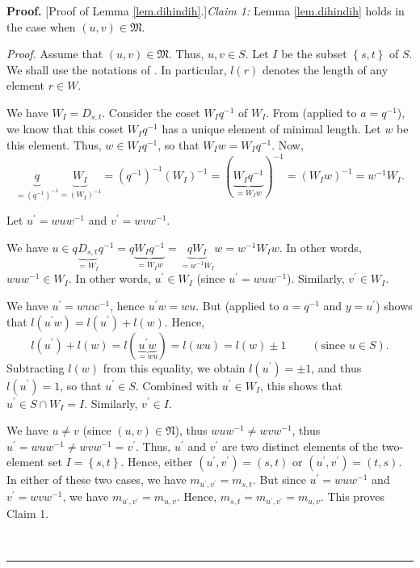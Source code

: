 \documentclass
[numbers=enddot,12pt,final,onecolumn,notitlepage,abstracton]{scrartcl}%
\theoremstyle{definition}
\newenvironment{proof}[1][Proof]{\noindent\textbf{#1.} }{\ \rule{0.5em}{0.5em}}
\begin{document}
\begin{proof}
[Proof of Lemma \ref{lem.dihindih}.]\textit{Claim 1:} Lemma \ref{lem.dihindih}
holds in the case when $\left(  u,v\right)  \in\mathfrak{M}$.

\textit{Proof.} Assume that $\left(  u,v\right)  \in\mathfrak{M}$. Thus,
$u,v\in S$. Let $I$ be the subset $\left\{  s,t\right\}  $ of $S$. We shall
use the notations of \cite[\S 9]{Lusztig-Hecke}. In particular, $l\left(
r\right)  $ denotes the length of any element $r\in W$.

We have $W_{I}=D_{s,t}$. Consider the coset $W_{I}q^{-1}$ of $W_{I}$. From
\cite[Lemma 9.7 (a)]{Lusztig-Hecke} (applied to $a=q^{-1}$), we know that this
coset $W_{I}q^{-1}$ has a unique element of minimal length. Let $w$ be this
element. Thus, $w\in W_{I}q^{-1}$, so that $W_{I}w=W_{I}q^{-1}$. Now,
\[
\underbrace{q}_{=\left(  q^{-1}\right)  ^{-1}}\underbrace{W_{I}}_{=\left(
W_{I}\right)  ^{-1}}=\left(  q^{-1}\right)  ^{-1}\left(  W_{I}\right)
^{-1}=\left(  \underbrace{W_{I}q^{-1}}_{=W_{I}w}\right)  ^{-1}=\left(
W_{I}w\right)  ^{-1}=w^{-1}W_{I}.
\]


Let $u^{\prime}=wuw^{-1}$ and $v^{\prime}=wvw^{-1}$.

We have $u\in q\underbrace{D_{s,t}}_{=W_{I}}q^{-1}=q\underbrace{W_{I}q^{-1}%
}_{=W_{I}w}=\underbrace{qW_{I}}_{=w^{-1}W_{I}}w=w^{-1}W_{I}w$. In other words,
$wuw^{-1}\in W_{I}$. In other words, $u^{\prime}\in W_{I}$ (since $u^{\prime
}=wuw^{-1}$). Similarly, $v^{\prime}\in W_{I}$.

We have $u^{\prime}=wuw^{-1}$, hence $u^{\prime}w=wu$. But \cite[Lemma 9.7
(b)]{Lusztig-Hecke} (applied to $a=q^{-1}$ and $y=u^{\prime}$) shows that
$l\left(  u^{\prime}w\right)  =l\left(  u^{\prime}\right)  +l\left(  w\right)
$. Hence,
\[
l\left(  u^{\prime}\right)  +l\left(  w\right)  =l\left(
\underbrace{u^{\prime}w}_{=wu}\right)  =l\left(  wu\right)  =l\left(
w\right)  \pm1\ \ \ \ \ \ \ \ \ \ \left(  \text{since }u\in S\right)  .
\]
Subtracting $l\left(  w\right)  $ from this equality, we obtain $l\left(
u^{\prime}\right)  =\pm1$, and thus $l\left(  u^{\prime}\right)  =1$, so that
$u^{\prime}\in S$. Combined with $u^{\prime}\in W_{I}$, this shows that
$u^{\prime}\in S\cap W_{I}=I$. Similarly, $v^{\prime}\in I$.

We have $u\neq v$ (since $\left(  u,v\right)  \in\mathfrak{N}$), thus
$wuw^{-1}\neq wvw^{-1}$, thus $u^{\prime}=wuw^{-1}\neq wvw^{-1}=v^{\prime}$.
Thus, $u^{\prime}$ and $v^{\prime}$ are two distinct elements of the
two-element set $I=\left\{  s,t\right\}  $. Hence, either $\left(  u^{\prime
},v^{\prime}\right)  =\left(  s,t\right)  $ or $\left(  u^{\prime},v^{\prime
}\right)  =\left(  t,s\right)  $. In either of these two cases, we have
$m_{u^{\prime},v^{\prime}}=m_{s,t}$. But since $u^{\prime}=wuw^{-1}$ and
$v^{\prime}=wvw^{-1}$, we have $m_{u^{\prime},v^{\prime}}=m_{u,v}$. Hence,
$m_{s,t}=m_{u^{\prime},v^{\prime}}=m_{u,v}$. This proves Claim 1.


\end{proof}
\end{document}
